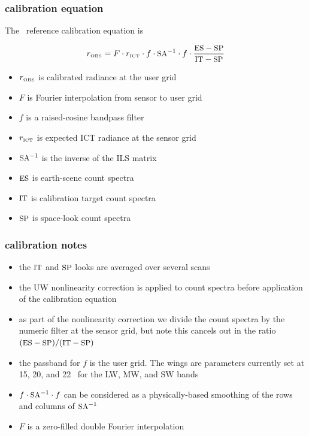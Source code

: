 \begin{frame}
\frametitle{calibration equation}

The \ccast\ reference calibration equation is

\[r_{\mbox{\tiny OBS}} = F \cdot r_{\mbox{\tiny ICT}}\cdot f \cdot
  \mbox{\small SA}^{-1}\cdot f \cdot \frac{\mbox{\small ES} - \mbox{\small SP}}{\mbox{\small IT} - \mbox{\small SP}} \]

\begin{itemize}
  \item $r_{\mbox{\tiny OBS}}$ is calibrated radiance at the user grid
  \item $F$ is Fourier interpolation from sensor to user grid
  \item $f$ is a raised-cosine bandpass filter
  \item $r_{\mbox{\tiny ICT}}$ is expected ICT radiance at the sensor grid
  \item $\mbox{\small SA}^{-1}$ is the inverse of the ILS matrix
  \item $\mbox{\small ES}$ is earth-scene count spectra
  \item $\mbox{\small IT}$ is calibration target count spectra
  \item $\mbox{\small SP}$ is space-look count spectra
\end{itemize}

\end{frame}
\begin{frame}
\frametitle{calibration notes}

\begin{itemize}

  \item the $\mbox{\small IT}$ and $\mbox{\small SP}$ looks are averaged over several scans

  \item the UW nonlinearity correction is applied to count spectra
    before application of the calibration equation

  \item as part of the nonlinearity correction we divide the count
    spectra by the numeric filter at the sensor grid, but note this
    cancels out in the ratio $(\mbox{\small ES} - \mbox{\small SP}) / (\mbox{\small IT} - \mbox{\small SP})$

  \item the passband for $f$ is the user grid.  The wings are
    parameters currently set at 15, 20, and 22 \wnum\ for the LW,
    MW, and SW bands

  \item $f \cdot \mbox{\small SA}^{-1} \cdot f$ can be considered as a
    physically-based smoothing of the rows and columns of $\mbox{\small SA}^{-1}$

  \item $F$ is a zero-filled double Fourier interpolation

\end{itemize}

\end{frame}
